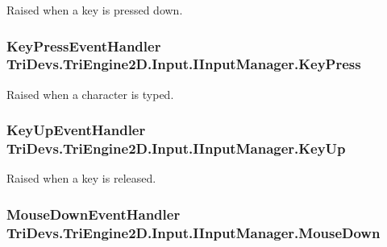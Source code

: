 Raised when a key is pressed down. 

\hypertarget{interface_tri_devs_1_1_tri_engine2_d_1_1_input_1_1_i_input_manager_a08f324d5224dd4f6b2214f9b5ea76c22}{
\subsubsection[{Key\-Press}]{\setlength{\rightskip}{0pt plus 5cm}Key\-Press\-Event\-Handler Tri\-Devs.\-Tri\-Engine2\-D.\-Input.\-I\-Input\-Manager.\-Key\-Press}}\label{interface_tri_devs_1_1_tri_engine2_d_1_1_input_1_1_i_input_manager_a08f324d5224dd4f6b2214f9b5ea76c22}


Raised when a character is typed. 

\hypertarget{interface_tri_devs_1_1_tri_engine2_d_1_1_input_1_1_i_input_manager_a84ffeb24cb3583038b62b4a91fcfadc4}{
\subsubsection[{Key\-Up}]{\setlength{\rightskip}{0pt plus 5cm}Key\-Up\-Event\-Handler Tri\-Devs.\-Tri\-Engine2\-D.\-Input.\-I\-Input\-Manager.\-Key\-Up}}\label{interface_tri_devs_1_1_tri_engine2_d_1_1_input_1_1_i_input_manager_a84ffeb24cb3583038b62b4a91fcfadc4}


Raised when a key is released. 

\hypertarget{interface_tri_devs_1_1_tri_engine2_d_1_1_input_1_1_i_input_manager_a5bf6aff053702524922cdef1c0eda2f6}{
\subsubsection[{Mouse\-Down}]{\setlength{\rightskip}{0pt plus 5cm}Mouse\-Down\-Event\-Handler Tri\-Devs.\-Tri\-Engine2\-D.\-Input.\-I\-Input\-Manager.\-Mouse\-Down}}\label{interface_tri_devs_1_1_tri_engine2_d_1_1_input_1_1_i_input_manager_a5bf6aff053702524922cdef1c0eda2f6}


